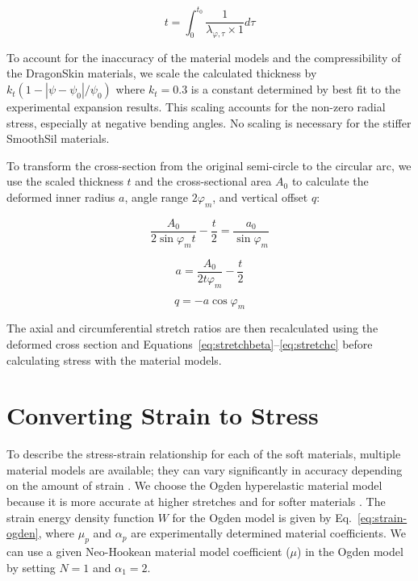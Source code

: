 \begin{equation}
    t = \int_0^{t_0} \frac{1}{\lambda_{\varphi,\tau} \times 1} d\tau 
    \label{eq:thicknessfromlambdar}
\end{equation}

To account for the inaccuracy of the material models and the compressibility of the DragonSkin materials, we scale the calculated thickness by $k_t(1-|\psi-\psi_0|/\psi_0)$ where $k_t = 0.3$ is a constant determined by best fit to the experimental expansion results. This scaling accounts for the non-zero radial stress, especially at negative bending angles. No scaling is necessary for the stiffer SmoothSil materials. 

To transform the cross-section from the original semi-circle to the circular arc, we use the scaled thickness $t$ and the cross-sectional area $A_0$ to calculate the deformed inner radius $a$, angle range $2\varphi_m$, and vertical offset $q$:

\begin{equation}
    \frac{A_0}{2\sin{\varphi_m}t}-\frac{t}{2}=\frac{a_0}{\sin{\varphi_m}}
    \label{eq:phi_m}
\end{equation}

\begin{equation}
    a=\frac{A_0}{2t\varphi_m}-\frac{t}{2}
    \label{eq:a_aug}
\end{equation}

\begin{equation}
    q=-a\cos{\varphi_m}
    \label{eq:q_aug}
\end{equation}

The axial and circumferential stretch ratios are then recalculated using the deformed cross section and Equations~\ref{eq:stretchbeta}--\ref{eq:stretchc} before calculating stress with the material models.

\section{Converting Strain to Stress}

To describe the stress-strain relationship for each of the soft materials, multiple material models are available; they can vary significantly in accuracy depending on the amount of strain \cite{paterno_hybrid_2018}. We choose the Ogden hyperelastic material model because it is more accurate at higher stretches and for softer materials \cite{marechal_toward_2021}. The strain energy density function $W$ for the Ogden model is given by Eq.~\ref{eq:strain-ogden}, where $\mu_{p}$ and $\alpha_{p}$ are experimentally determined material coefficients. We can use a given Neo-Hookean material model coefficient ($\mu$) in the Ogden model by setting $N=1$ and $\alpha_1=2$. 


